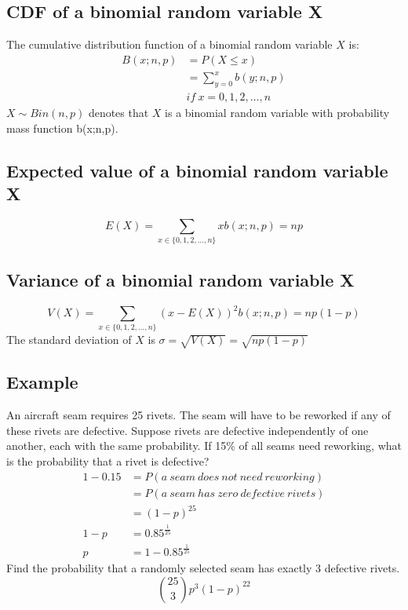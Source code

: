 \documentclass{math}
\begin{document}
\subsection*{CDF of a binomial random variable X}
The cumulative distribution function of a binomial random variable \( X \) is:
\begin{align*}
  B(x;n,p) &= P(X\leq x) \\
  &= \sum_{y=0}^{x}b(y;n,p) \\
  & if\ x = 0,1,2,\dots,n
\end{align*}
\( X\sim Bin(n,p) \) denotes that \( X \) is a binomial random variable with
probability mass function b(x;n,p).

\subsection*{Expected value of a binomial random variable X}
\[ E(X) = \sum_{x\in\{0,1,2,\dots,n\}}xb(x;n,p) = np \]

\subsection*{Variance of a binomial random variable X}
\[ V(X) = \sum_{x\in\{0,1,2,\dots,n\}}(x-E(X))^{2}b(x;n,p) = np(1-p) \]
The standard deviation of \( X \) is \( \sigma = \sqrt{V(X)} = \sqrt{np(1-p)} \)

\subsection*{Example}
An aircraft seam requires 25 rivets. The seam will have to be reworked if any
of these rivets are defective. Suppose rivets are defective independently of
one another, each with the same probability. If 15\% of all seams need
reworking, what is the probability that a rivet is defective?
\begin{align*}
  1-0.15 &= P(a\ seam\ does\ not\ need\ reworking) \\
  &= P(a\ seam\ has\ zero\ defective\ rivets) \\
  &= (1-p)^{25} \\
  1-p &= 0.85^{\frac{1}{25}} \\
  p &= 1-0.85^{\frac{1}{25}}
\end{align*}
Find the probability that a randomly selected seam has exactly 3 defective
rivets.
\[ \binom{25}{3}p^{3}(1-p)^{22} \]
\end{document}
